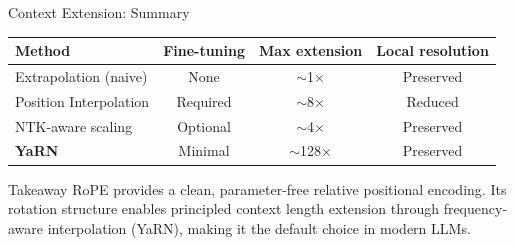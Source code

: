 \begin{frame}{Context Extension: Summary}

  \begin{center}
  \begin{tabular}{l c c c}
    \toprule
    \textbf{Method} & \textbf{Fine-tuning} & \textbf{Max extension} & \textbf{Local resolution} \\
    \midrule
    Extrapolation (naive)    & None     & $\sim$1$\times$    & Preserved \\
    Position Interpolation   & Required & $\sim$8$\times$    & Reduced \\
    NTK-aware scaling        & Optional & $\sim$4$\times$    & Preserved \\
    \textbf{YaRN}            & Minimal  & $\sim$128$\times$  & Preserved \\
    \bottomrule
  \end{tabular}
  \end{center}

  \vspace{0.5em}
  \begin{block}{Takeaway}
    RoPE provides a clean, parameter-free relative positional encoding.
    Its rotation structure enables principled context length extension
    through frequency-aware interpolation (YaRN), making it the default
    choice in modern LLMs.
  \end{block}

\end{frame}
